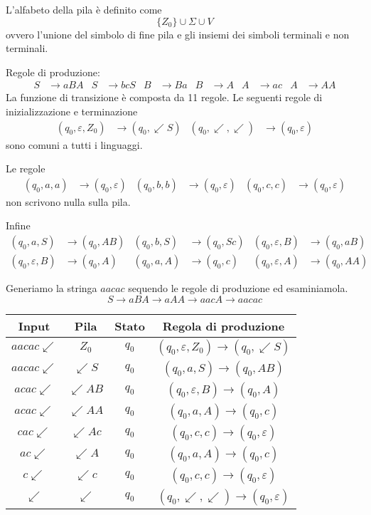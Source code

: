 \documentclass[11pt]{article}
\begin{document}
L'alfabeto della pila è definito come
\begin{equation*}
    \{Z_0\}\cup \Sigma \cup V
\end{equation*}
ovvero l'unione del simbolo di fine pila e gli insiemi dei simboli terminali e non terminali.

Regole di produzione:
\begin{align*}
    S&\rightarrow aBA & S&\rightarrow bcS & B&\rightarrow Ba & B&\rightarrow A & A&\rightarrow ac & A&\rightarrow AA
\end{align*}
La funzione di transizione è composta da 11 regole. Le seguenti regole di inizializzazione e terminazione
\begin{align*}
    (q_0,\varepsilon,Z_0)&\rightarrow(q_0,\swarrow S) & (q_0,\swarrow,\swarrow)&\rightarrow(q_0,\varepsilon)
\end{align*}
sono comuni a tutti i linguaggi.

Le regole
\begin{align*}
    (q_0,a,a)&\rightarrow(q_0,\varepsilon) & (q_0,b,b)&\rightarrow(q_0,\varepsilon) & (q_0,c,c)&\rightarrow(q_0,\varepsilon)
\end{align*}
non scrivono nulla sulla pila. 

Infine
\begin{align*}
    (q_0,a,S)&\rightarrow(q_0,AB) & (q_0,b,S)&\rightarrow(q_0,Sc) & (q_0,\varepsilon,B)&\rightarrow(q_0,aB)\\
    (q_0,\varepsilon,B)&\rightarrow(q_0,A) & (q_0,a,A)&\rightarrow(q_0,c) & (q_0,\varepsilon,A)&\rightarrow(q_0,AA)
\end{align*}

Generiamo la stringa $aacac$ sequendo le regole di produzione ed esaminiamola.
\begin{equation*}
    S\rightarrow aBA\rightarrow aAA \rightarrow aacA \rightarrow aacac
\end{equation*}
\begin{center}
    \begin{tabular}{ |c|c|c|c| }
     \hline
     Input & Pila & Stato & Regola di produzione \\ 
     \hline\hline
     $aacac\swarrow$ & $Z_0$ & $q_0$ & $(q_0,\varepsilon,Z_0)\rightarrow(q_0,\swarrow S)$ \\ 
     $aacac\swarrow$ & $\swarrow S$ & $q_0$ & $(q_0,a,S)\rightarrow(q_0,AB)$ \\ 
     $acac\swarrow$ & $\swarrow AB$ & $q_0$ &  $(q_0,\varepsilon,B)\rightarrow(q_0,A)$\\ 
     $acac\swarrow$ & $\swarrow AA$ & $q_0$ & $(q_0,a,A)\rightarrow(q_0,c)$ \\ 
     $cac\swarrow$ & $\swarrow Ac$ & $q_0$ &  $(q_0,c,c)\rightarrow(q_0,\varepsilon)$\\ 
     $ac\swarrow$ & $\swarrow A$ & $q_0$ & $(q_0,a,A)\rightarrow(q_0,c)$ \\ 
     $c\swarrow$ & $\swarrow c$ & $q_0$ & $(q_0,c,c)\rightarrow(q_0,\varepsilon)$ \\
     $\swarrow$ & $\swarrow$ & $q_0$ & $(q_0,\swarrow,\swarrow)\rightarrow(q_0,\varepsilon)$ \\ 
     \hline
    \end{tabular}
\end{center}
\end{document}

